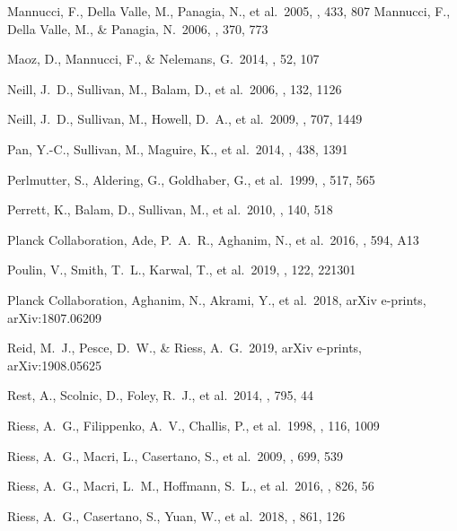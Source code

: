 \documentclass[]{aa} %
\begin{document}
\begin{thebibliography}{}
 Mannucci, F.,
  Della Valle, M., Panagia, N., et al.\ 2005, \aap, 433, 807 
 Mannucci, F.,
  Della Valle, M., \& Panagia, N.\ 2006, \mnras, 370, 773 

 Maoz, D., Mannucci,
  F., \& Nelemans, G.\ 2014, \araa, 52, 107 


 Neill, J.~D., Sullivan, M., Balam, D., et al.\ 2006, \aj, 132, 1126

 Neill, J.~D., Sullivan, M., Howell, D.~A., et al.\ 2009, \apj, 707, 1449

 Pan, Y.-C., Sullivan, M., Maguire, K., et al.\ 2014, \mnras, 438, 1391

 Perlmutter, S., Aldering, G., Goldhaber, G., et al.\ 1999, \apj, 517, 565

 Perrett, K., Balam, D., Sullivan, M., et al.\ 2010, \aj, 140, 518

 Planck Collaboration, Ade, P.~A.~R., Aghanim, N., et al.\ 2016, \aap, 594, A13

 Poulin, V., Smith, T.~L., Karwal, T., et al.\ 2019, \prl, 122, 221301

 Planck Collaboration, Aghanim, N., Akrami, Y., et al.\ 2018, arXiv e-prints, arXiv:1807.06209

 Reid, M.~J., Pesce, D.~W., \& Riess, A.~G.\ 2019, arXiv e-prints, arXiv:1908.05625

 Rest, A., Scolnic, D., Foley, R.~J., et al.\ 2014, \apj, 795, 44

 Riess, A.~G., Filippenko, A.~V., Challis, P., et al.\ 1998, \aj, 116, 1009

 Riess, A.~G., Macri, L., Casertano, S., et al.\ 2009, \apj, 699, 539

 Riess, A.~G., Macri, L.~M., Hoffmann, S.~L., et al.\ 2016, \apj, 826, 56

 Riess, A.~G., Casertano, S., Yuan, W., et al.\ 2018, \apj, 861, 126


\end{thebibliography}
\end{document}
